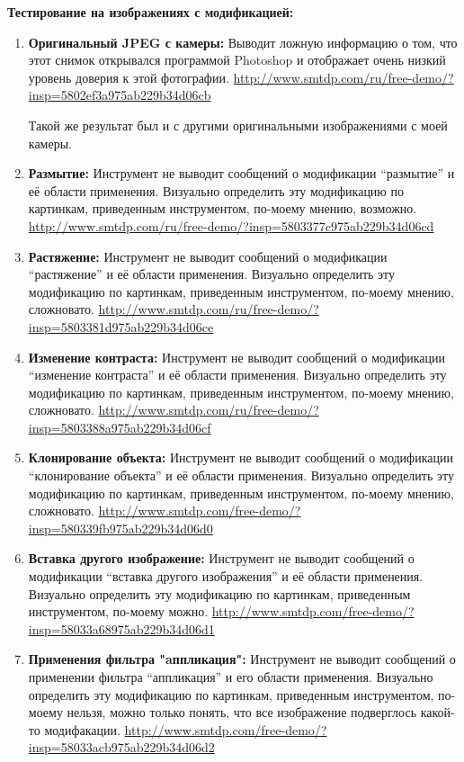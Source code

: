 \textbf{Тестирование на изображениях с модификацией:}
\begin{enumerate}
\item \textbf{Оригинальный JPEG с камеры:}
Выводит ложную информацию о том, что этот снимок открывался программой Photoshop и отображает очень низкий уровень доверия к этой фотографии.
\url{http://www.smtdp.com/ru/free-demo/?insp=5802ef3a975ab229b34d06cb}

Такой же результат был и с другими оригинальными изображениями с моей камеры.
\item \textbf{Размытие:}
Инструмент не выводит сообщений о модификации “размытие” и её области применения. Визуально определить эту модификацию по картинкам, приведенным инструментом, по-моему мнению, возможно.
\url{http://www.smtdp.com/ru/free-demo/?insp=5803377c975ab229b34d06cd}

\item \textbf{Растяжение:}
Инструмент не выводит сообщений о модификации “растяжение” и её области применения. Визуально определить эту модификацию по картинкам, приведенным инструментом, по-моему мнению, сложновато.
\url{http://www.smtdp.com/ru/free-demo/?insp=5803381d975ab229b34d06ce}

\item \textbf{Изменение контраста:}
Инструмент не выводит сообщений о модификации “изменение контраста” и её области применения. Визуально определить эту модификацию по картинкам, приведенным инструментом, по-моему мнению, сложновато.
\url{http://www.smtdp.com/ru/free-demo/?insp=5803388a975ab229b34d06cf}

\item \textbf{Клонирование объекта:}
Инструмент не выводит сообщений о модификации “клонирование объекта” и её области применения. Визуально определить эту модификацию по картинкам, приведенным инструментом, по-моему мнению, сложновато.
\url{http://www.smtdp.com/free-demo/?insp=580339fb975ab229b34d06d0}

\item \textbf{Вставка другого изображение:}
Инструмент не выводит сообщений о модификации “вставка другого изображения” и её области применения. Визуально определить эту модификацию по картинкам, приведенным инструментом, по-моему можно.
\url{http://www.smtdp.com/free-demo/?insp=58033a68975ab229b34d06d1} 

\item \textbf{Применения фильтра "aппликация":}
Инструмент не выводит сообщений о применении фильтра “аппликация” и его области применения. Визуально определить эту модификацию по картинкам, приведенным инструментом, по-моему нельзя, можно только понять, что все изображение подверглось какой-то модифакации. 
\url{http://www.smtdp.com/free-demo/?insp=58033acb975ab229b34d06d2}
\end{enumerate}

